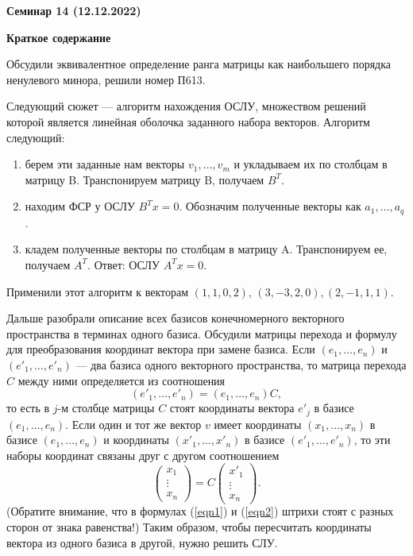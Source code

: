 \documentclass[10pt, a4paper]{extarticle}
\theoremstyle{definition}
\begin{document}
\begin{center}
\small
\noindent{}
\end{center}

\large

\begin{center}
\textbf{Семинар 14 (12.12.2022)}
\end{center}

\textbf{Краткое содержание}

Обсудили эквивалентное определение ранга матрицы как наибольшего порядка ненулевого минора, решили номер П613.

Следующий сюжет --- алгоритм нахождения ОСЛУ, множеством решений которой является линейная оболочка заданного набора векторов. Алгоритм следующий:
\begin{enumerate}
    \item берем эти заданные нам векторы $v_1, \dots, v_m$ и укладываем их по столбцам в матрицу B. Транспонируем матрицу B, получаем $B^T$.
    \item находим ФСР у ОСЛУ $B^Tx=0$. Обозначим полученные векторы как $a_1, \dots, a_q$.
    \item кладем полученные векторы по столбцам в матрицу A. Транспонируем ее, получаем $A^T$. Ответ: ОСЛУ $A^Tx=0$.
\end{enumerate}
Применили этот алгоритм к векторам $(1, 1, 0, 2)$, $(3, -3, 2, 0), (2, -1, 1, 1)$.

Дальше разобрали описание всех базисов конечномерного векторного пространства в терминах одного базиса.
Обсудили матрицы перехода и формулу для преобразования координат вектора при замене базиса.
Если $(e_1,\dots,e_n)$ и $(e'_1,\dots,e'_n)$ --- два базиса одного векторного пространства, то матрица перехода $C$ между ними определяется из соотношения
\begin{equation} \label{eqn1}
(e'_1,\dots,e'_n) = (e_1,\dots,e_n)C,
\end{equation}
то есть в $j$-м столбце матрицы $C$ стоят координаты вектора $e'_j$ в базисе $(e_1,\dots,e_n)$.
Если один и тот же вектор $v$ имеет координаты $(x_1,\dots, x_n)$ в базисе $(e_1,\dots, e_n)$ и координаты $(x'_1,\dots, x'_n)$ в 
базисе $(e'_1,\dots, e'_n)$, то эти наборы координат связаны друг с другом соотношением
\begin{equation} \label{eqn2}
\begin{pmatrix} x_1 \\ \vdots \\ x_n \end{pmatrix} =
C
\begin{pmatrix} x'_1 \\ \vdots \\ x_n \end{pmatrix}.
\end{equation}
(Обратите внимание, что в формулах (\ref{eqn1}) и (\ref{eqn2}) штрихи стоят с разных сторон от знака равенства!)
Таким образом, чтобы пересчитать координаты вектора из одного базиса в другой, нужно решить СЛУ.
\end{document}
